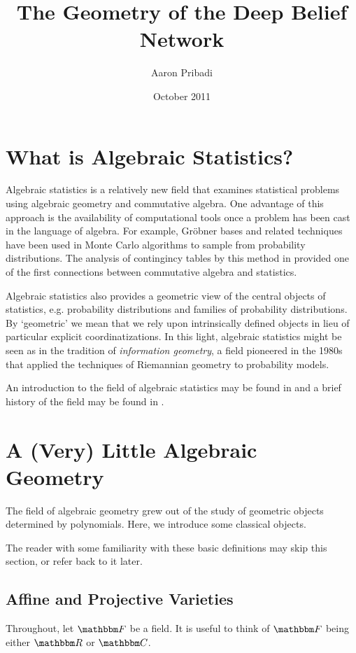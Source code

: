 \documentclass[11pt,titlepage]{article}
\title{The Geometry of the Deep Belief Network}
\author{Aaron Pribadi}
\date{October 2011}
\begin{document}
\maketitle

\tableofcontents

\pagebreak

\section{What is Algebraic Statistics?}

    Algebraic statistics is a relatively new field that examines statistical
    problems using algebraic geometry and commutative algebra.  One advantage of
    this approach is the availability of computational tools once a problem has
    been cast in the language of algebra.  For example, Gröbner bases and
    related techniques have been used in Monte Carlo algorithms to sample from
    probability distributions.  The analysis of contingincy tables by this
    method in \cite{DS98} provided one of the first connections between
    commutative algebra and statistics.

    Algebraic statistics also provides a geometric view of the central objects
    of statistics, e.g. probability distributions and families of probability
    distributions.  By `geometric' we mean that we rely upon intrinsically
    defined objects in lieu of particular explicit coordinatizations.  In this
    light, algebraic statistics might be seen as in the tradition of
    \emph{information geometry}, a field pioneered in the 1980s that applied the
    techniques of Riemannian geometry to probability models.

    An introduction to the field of algebraic statistics may be found in
    \cite{DSS09} and a brief history of the field may be found in \cite{Ricc09}.

\section{A (Very) Little Algebraic Geometry}

    The field of algebraic geometry grew out of the study of geometric objects
    determined by polynomials.  Here, we introduce some classical objects.  
    
    The reader with some familiarity with these basic definitions may skip this
    section, or refer back to it later.  


\subsection{Affine and Projective Varieties}
    Throughout, let $\F$ be a field.  It is useful to think of $\F$ being either
    $\R$ or $\C$.
\end{document}
